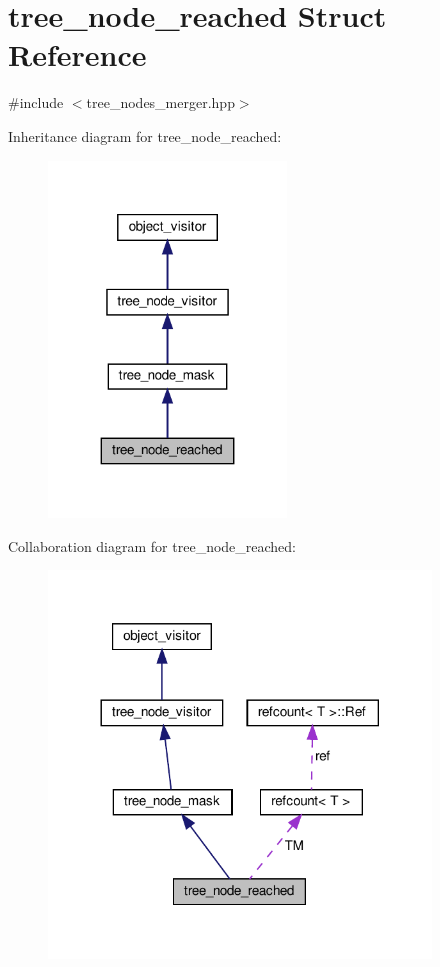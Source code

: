 \hypertarget{structtree__node__reached}{}\section{tree\+\_\+node\+\_\+reached Struct Reference}
\label{structtree__node__reached}


{\ttfamily \#include $<$tree\+\_\+nodes\+\_\+merger.\+hpp$>$}



Inheritance diagram for tree\+\_\+node\+\_\+reached\+:
\nopagebreak
\begin{figure}[H]
\begin{center}
\leavevmode
\includegraphics[width=179pt]{d7/d1f/structtree__node__reached__inherit__graph}
\end{center}
\end{figure}


Collaboration diagram for tree\+\_\+node\+\_\+reached\+:
\nopagebreak
\begin{figure}[H]
\begin{center}
\leavevmode
\includegraphics[width=288pt]{d5/d85/structtree__node__reached__coll__graph}
\end{center}
\end{figure}
